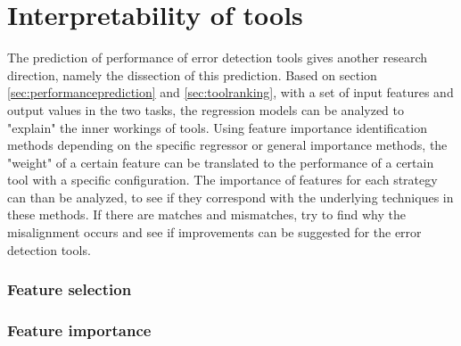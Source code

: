 \section{Interpretability of tools}
\label{sec:interpretabilityoftools}
The prediction of performance of error detection tools gives another research direction, namely the dissection of this prediction.
Based on section \ref{sec:performanceprediction} and \ref{sec:toolranking}, with a set of input features and output values in the two tasks, the regression models can be analyzed to "explain" the inner workings of tools. Using feature importance identification methods depending on the specific regressor or general importance methods, the "weight" of a certain feature can be translated to the performance of a certain tool with a specific configuration. The importance of features for each strategy can than be analyzed, to see if they correspond with the underlying techniques in these methods. If there are matches and mismatches, try to find why the misalignment occurs and see if improvements can be suggested for the error detection tools.



\subsubsection{Feature selection}

\subsubsection{Feature importance}